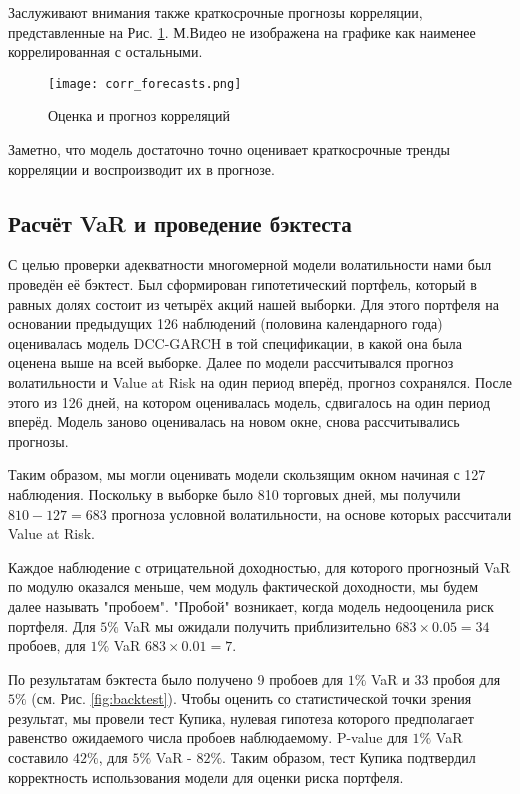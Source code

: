 \documentclass[a4paper,11pt]{article}
\begin{document}
Заслуживают внимания также краткосрочные прогнозы корреляции, представленные на Рис. \ref{fig:corr_fcsts}. М.Видео не изображена на графике как наименее коррелированная с остальными.

\begin{figure}[h]
  \advance\leftskip-3.5cm
    \texttt{[image: corr\_forecasts.png]}
    \caption{Оценка и прогноз корреляций}
    \label{fig:corr_fcsts}
\end{figure}

Заметно, что модель достаточно точно оценивает краткосрочные тренды корреляции и воспроизводит их в прогнозе.

\subsection{Расчёт VaR и проведение бэктеста}\label{backtesting}
С целью проверки адекватности многомерной модели волатильности нами был проведён её бэктест. Был сформирован гипотетический портфель, который в равных долях состоит из четырёх акций нашей выборки. Для этого портфеля на основании предыдущих 126 наблюдений (половина календарного года) оценивалась модель DCC-GARCH в той спецификации, в какой она была оценена выше на всей выборке. Далее по модели рассчитывался прогноз волатильности и Value at Risk на один период вперёд, прогноз сохранялся. После этого из 126 дней, на котором оценивалась модель, сдвигалось на один период вперёд. Модель заново оценивалась на новом окне, снова рассчитывались прогнозы. 

Таким образом, мы могли оценивать модели скользящим окном начиная с 127 наблюдения. Поскольку в выборке было 810 торговых дней, мы получили $810-127=683$ прогноза условной волатильности, на основе которых рассчитали Value at Risk.

Каждое наблюдение с отрицательной доходностью, для которого прогнозный VaR по модулю оказался меньше, чем модуль фактической доходности, мы будем далее называть "пробоем". "Пробой" возникает, когда модель недооценила риск портфеля. Для $5\%$ VaR мы ожидали получить приблизительно $683\times0.05=34$ пробоев, для $1\%$ VaR $683\times0.01=7$.

По результатам бэктеста было получено 9 пробоев для $1\%$ VaR и 33 пробоя для $5\%$ (см. Рис. \ref{fig:backtest}). Чтобы оценить со статистической точки зрения результат, мы провели тест Купика, нулевая гипотеза которого предполагает равенство ожидаемого числа пробоев наблюдаемому. P-value для $1\%$ VaR составило $42\%$, для $5\%$ VaR - $82\%$. Таким образом, тест Купика подтвердил корректность использования модели для оценки риска портфеля.  
\end{document}
